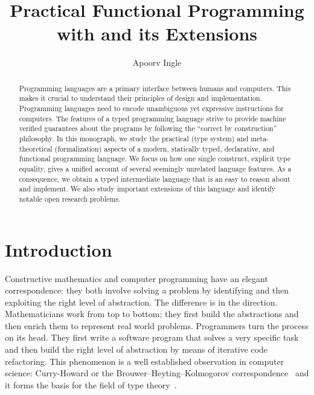 \documentclass[screen,nonacm,manuscript,review]{acmart} %
\title{Practical Functional Programming with \SFC and its Extensions}
\author{Apoorv Ingle}
\affiliation{%
  \institution{University of Iowa} \department{Department of Computer Science} \streetaddress{McLean Hall} \city{Iowa City} \state{Iowa} \country{USA}}
\begin{document}
\begin{abstract}
  Programming languages are a primary interface between humans
  and computers. This makes it crucial to understand their principles of design
  and implementation. Programming languages need to encode unambiguous yet
  expressive instructions for computers. The
  features of a typed programming language strive to provide machine
  verified guarantees about the programs by following the  ``correct
  by construction'' philosophy. In this monograph, we study the practical
  (type system) and meta-theoretical (formalization) aspects of a
  modern, statically typed, declarative, and functional
  programming language. We focus on how one single construct,
  explicit type equality, gives a unified account of several seemingly
  unrelated language features. As a consequence, we obtain a typed
  intermediate language that is an easy to
  reason about and implement. We also
  study important extensions of this language and identify notable open
  research problems.
\end{abstract}

\maketitle
\section{Introduction}\label{sec:introduction}
Constructive mathematics and computer programming have an elegant
correspondence: they both involve solving a problem by
identifying and then exploiting the right level of abstraction.
The difference is in the direction.
Mathematicians work from top to bottom; they first build the abstractions
and then enrich them to represent real world
problems. Programmers turn the process on its head.
They first write a software program that solves a very specific
task and then build the right level of abstraction by means of
iterative code refactoring. This phenomenon is a well established
observation in computer science: Curry-Howard or the
Brouwer–Heyting–Kolmogorov correspondence~\cite{wadler_propositions_2015,han_deep_2023}
and it forms the basis for the field of type
theory~\cite{barendregt_lambda_2013,hottbook_2013,nordstrom_programming_1990}.
\end{document}
